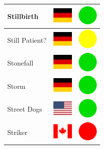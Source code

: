 \documentclass[12pt, a4paper, twoside]{report}
\begin{document}
\begin{center}
\begin{longtable}{|p{5cm}|p{2cm}|p{2cm}|}
Stillbirth & \includegraphics[width=1cm]{4x3/de} & \includegraphics[width=1cm]{likes/y} \\ \hline
Still Patient? & \includegraphics[width=1cm]{4x3/de} & \includegraphics[width=1cm]{likes/m} \\ \hline
Stonefall & \includegraphics[width=1cm]{4x3/de} & \includegraphics[width=1cm]{likes/y} \\ \hline
Storm & \includegraphics[width=1cm]{4x3/de} & \includegraphics[width=1cm]{likes/y} \\ \hline
Street Dogs & \includegraphics[width=1cm]{4x3/us} & \includegraphics[width=1cm]{likes/y} \\ \hline
Striker & \includegraphics[width=1cm]{4x3/ca} & \includegraphics[width=1cm]{likes/n} \\ \hline

\end{longtable}
\end{center}
\end{document}
